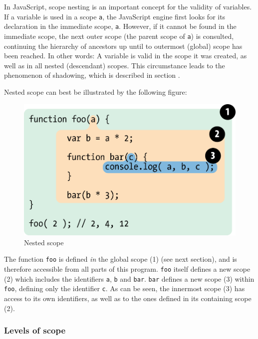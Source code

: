 In JavaScript, scope nesting is an important concept for the validity of
variables. If a variable is used in a scope \texttt{a}, the JavaScript
engine first looks for its declaration in the immediate scope,
\texttt{a}. However, if it cannot be found in the immediate scope, the
next outer scope (the parent scope of \texttt{a}) is consulted,
continuing the hierarchy of ancestors up until to outermost (global)
scope has been reached. In other words: A variable is valid in the scope
it was created, as well as in all nested (descendant) scopes. This
circumstance leads to the phenomenon of shadowing, which is described in
section .

Nested scope can best be illustrated by the following figure:

\begin{figure}[htbp]
\centering
\includegraphics{fig2.png}
\caption{Nested scope \cite{getify}}
\end{figure}

The function \texttt{foo} is defined \emph{in} the global scope (1) (see
next section), and is therefore accessible from all parts of this
program. \texttt{foo} itself defines a new scope (2) which includes the
identifiers \texttt{a}, \texttt{b} and \texttt{bar}. \texttt{bar}
defines a new scope (3) within \texttt{foo}, defining only the
identifier \texttt{c}. As can be seen, the innermost scope (3) has
access to its own identifiers, as well as to the ones defined in its
containing scope (2).

\subsubsection{Levels of scope}\label{levels-of-scope}

